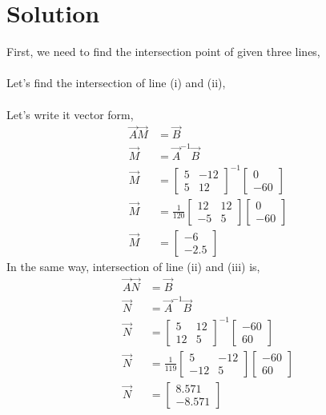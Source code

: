 \documentclass[journal,12pt,twocolumn]{IEEEtran}
\begin{document}
\section*{\textbf{Solution}}
\noindent
First, we need to find the intersection point of given three lines, \\
\\
Let's find the intersection of line (i) and (ii),\\
\\
Let's write it vector form,
\begin{align*}
\vec{A}\vec{M} &=\vec{B} \\
\vec{M} &= \vec{A}^{-1}\vec{B} \\
\vec{M}
& =
\begin{bmatrix}
5 & -12 \\
5 & 12 
\end{bmatrix}^{-1}
\begin{bmatrix}
0 \\ -60
\end{bmatrix}  \\[6pt]
\vec{M}
& =
\frac{1}{120}
\begin{bmatrix}
12 & 12 \\
-5 & 5 
\end{bmatrix}
\begin{bmatrix}
0 \\ -60
\end{bmatrix} \\[6pt]
\vec{M}
&=
\begin{bmatrix}
-6 \\ -2.5
\end{bmatrix}
\end{align*}
In the same way, intersection of line (ii) and (iii) is,
\begin{align*}
\vec{A}\vec{N} &=\vec{B} \\
\vec{N} &= \vec{A}^{-1}\vec{B} \\
\vec{N}
& =
\begin{bmatrix}
5 & 12 \\
12 & 5 
\end{bmatrix}^{-1}
\begin{bmatrix}
-60 \\ 60
\end{bmatrix}  \\[6pt]
\vec{N}
& =
\frac{1}{119}
\begin{bmatrix}
5 & -12 \\
-12 & 5 
\end{bmatrix}
\begin{bmatrix}
-60 \\ 60
\end{bmatrix} \\[6pt]
\vec{N}
&=
\begin{bmatrix}
8.571 \\ -8.571
\end{bmatrix}
\end{align*}
\end{document}
